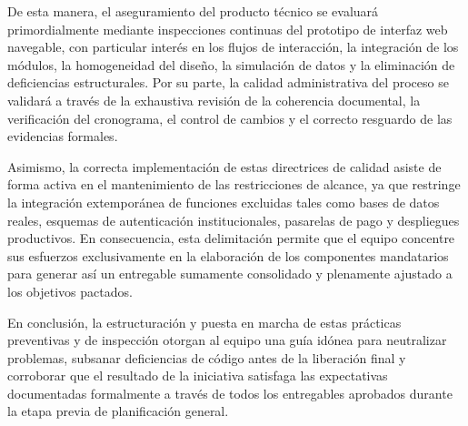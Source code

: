\documentclass[11pt,spanish]{article}
\begin{document}
De esta manera, el aseguramiento del producto técnico se evaluará primordialmente mediante inspecciones continuas del prototipo de interfaz web navegable, con particular interés en los flujos de interacción, la integración de los módulos, la homogeneidad del diseño, la simulación de datos y la eliminación de deficiencias estructurales. Por su parte, la calidad administrativa del proceso se validará a través de la exhaustiva revisión de la coherencia documental, la verificación del cronograma, el control de cambios y el correcto resguardo de las evidencias formales.

Asimismo, la correcta implementación de estas directrices de calidad asiste de forma activa en el mantenimiento de las restricciones de alcance, ya que restringe la integración extemporánea de funciones excluidas tales como bases de datos reales, esquemas de autenticación institucionales, pasarelas de pago y despliegues productivos. En consecuencia, esta delimitación permite que el equipo concentre sus esfuerzos exclusivamente en la elaboración de los componentes mandatarios para generar así un entregable sumamente consolidado y plenamente ajustado a los objetivos pactados.

En conclusión, la estructuración y puesta en marcha de estas prácticas preventivas y de inspección otorgan al equipo una guía idónea para neutralizar problemas, subsanar deficiencias de código antes de la liberación final y corroborar que el resultado de la iniciativa satisfaga las expectativas documentadas formalmente a través de todos los entregables aprobados durante la etapa previa de planificación general.
\end{document}

